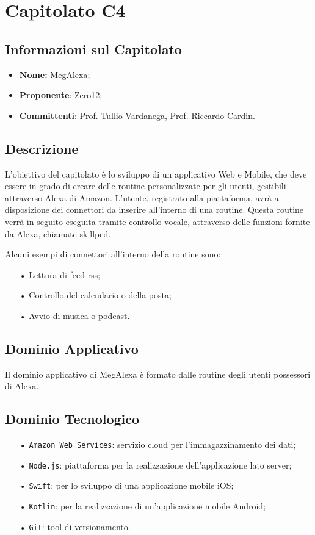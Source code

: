 \section{Capitolato C4}
\subsection{Informazioni sul Capitolato}
\begin{itemize}
	\item \textbf{Nome:} MegAlexa;
	\item \textbf{Proponente}: Zero12;
	\item \textbf{Committenti}: Prof. Tullio Vardanega, Prof. Riccardo Cardin.
\end{itemize}

\subsection{Descrizione}
L'obiettivo del capitolato è lo sviluppo di un applicativo Web e Mobile, che deve essere in grado di creare delle routine personalizzate per gli utenti, gestibili attraverso Alexa di Amazon.
L'utente, registrato alla piattaforma, avrà a disposizione dei {connettori} da inserire all'interno di una routine. Questa routine verrà in seguito eseguita tramite controllo vocale, attraverso delle funzioni fornite da Alexa, chiamate {skillped}.

Alcuni esempi di connettori all'interno della routine sono:
\begin{itemize}
\item[•] Lettura di feed {rss};
\item[•] Controllo del calendario o della posta;
\item[•] Avvio di musica o podcast.
\end{itemize}

\subsection{Dominio Applicativo}
Il dominio applicativo di MegAlexa è formato dalle routine degli utenti possessori di Alexa.

\subsection{Dominio Tecnologico}
\begin{itemize}

\item[•] \texttt{Amazon Web Services}: servizio cloud per l'immagazzinamento dei dati; 
\item[•] \texttt{Node.js}: piattaforma per la realizzazione dell'applicazione lato server;
\item[•] \texttt{Swift}: per lo sviluppo di una applicazione mobile iOS;
\item[•] \texttt{Kotlin}: per la realizzazione di un'applicazione mobile Android;
\item[•] \texttt{Git}: tool di versionamento.

\end{itemize}

